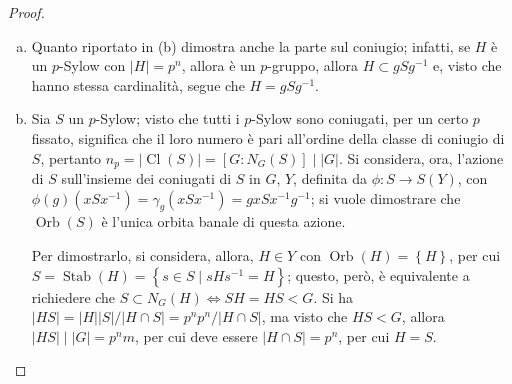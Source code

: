 \documentclass[12pt]{scrartcl}
\theoremstyle{style}
\numberwithin{equation}{subsection}
\begin{document}
\begin{proof}
\begin{enumerate}[(a).]
				Si considera l'azione di $H$ su $G / S = X$ definita da
				\[
					\varphi : 
					\begin{array}
						{c c c}
						H &\longrightarrow & S(X)\\
						h&\longmapsto & \varphi _h
					\end{array}, \text{ con } \varphi _h(gS) = hgS
				\] 
				Per la formula delle classi:
				\[
				m = \lvert X \rvert = \sum_{g \in R}^{} \lvert \operatorname{Orb} (g S) \rvert = \sum_{g \in R}^{} \frac{\lvert H \rvert }{\lvert \operatorname{Stab} (gS) \rvert } = \sum_{g \in R}^{} p^{a _g} 
				\] 
				dove $R$ \`e l'insieme dei rappresentanti delle classi di $G/S$ e $a_g$ \`e un esponente dipendente dal $g$ in $R$.
				Visto che $p  \nmid m $\footnote{Questo \`e per assunzione, cio\`e $\lvert G \rvert =p^n m $ con $(p,m) = 1$.}, deve esistere un $g \in R$ tale che $a_g=0$, per cui $\operatorname{Orb} (gS) = \left\{ gS \right\} \Rightarrow \operatorname{Stab} (gS) = H$.
				Questo significa anche che $\forall h\in H, \ hgS = gS \Rightarrow H \subset gSg^{-1}$, ma $gSg^{-1}$ \`e un $p$-Sylow perch\'e $\lvert gSg^{-1} \rvert = \lvert S \rvert $, quindi $H$ \`e contenuto in un $p$-Sylow.
			\item Quanto riportato in (b) dimostra anche la parte sul coniugio; infatti, se $H$ \`e un $p$-Sylow con $\lvert H\rvert = p^n$, allora \`e un $p$-gruppo, allora $H \subset gSg^{-1}$ e, visto che hanno stessa cardinalit\`a, segue che $H = g S g^{-1}$.
			\item Sia $S$ un $p$-Sylow; visto che tutti i $p$-Sylow sono coniugati, per un certo $p$ fissato, significa che il loro numero \`e pari all'ordine della classe di coniugio di $S$, pertanto $n_p = \lvert \operatorname{Cl} (S) \rvert  = [G:N_G(S)]  \mid  |G|$.
				Si considera, ora, l'azione di $S$ sull'insieme dei coniugati di $S$ in $G$, $Y$, definita da $\phi :S \to S(Y)$, con $\phi (g)(xSx^{-1}) = \gamma_g (xSx^{-1}) = gxSx^{-1}g^{-1}$; si vuole dimostrare che $\operatorname{Orb} (S)$ \`e l'unica orbita banale di questa azione.

				Per dimostrarlo, si considera, allora, $H \in Y$ con $\operatorname{Orb} (H) = \left\{ H \right\} $, per cui $S = \operatorname{Stab}(H) = \left\{ s \in S  \mid s H s^{-1} = H\right\}  $; questo, per\`o, \`e equivalente a richiedere che $S \subset  N_G(H) \iff SH = HS < G$.
				Si ha $\lvert HS \rvert = \lvert H \rvert \lvert S \rvert  / \lvert H \cap S \rvert = p^np^n / \lvert H\cap S \rvert $, ma visto che $HS < G$, allora $\lvert HS \rvert  \mid |G| = p^nm$, per cui deve essere $\lvert H\cap S \rvert =p^n$, per cui $H = S$.


\end{enumerate}
\end{proof}
\end{document}
